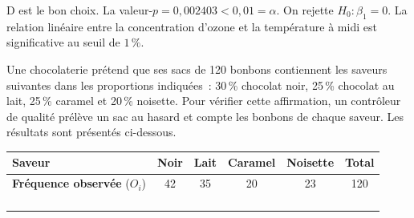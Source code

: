 \begin{questions}
\begin{parts}
\begin{solution}
D est le bon choix. La valeur-$p = 0{,}002403 < 0{,}01 = \alpha$. On rejette $H_0\!: \beta_1=0$. La relation linéaire entre la concentration d'ozone et la température à midi est significative au seuil de $1\,\%$.
\end{solution}

\end{parts}


\pageblanche
\question Une chocolaterie prétend que ses sacs de 120 bonbons contiennent les saveurs suivantes dans les proportions indiquées~: 30\,\% chocolat noir, 25\,\% chocolat au lait, 25\,\% caramel et 20\,\% noisette. Pour vérifier cette affirmation, un contrôleur de qualité prélève un sac au hasard et compte les bonbons de chaque saveur. Les résultats sont présentés ci-dessous.

\begin{center}
\begin{tabular}{l|c|c|c|c|c}
\textbf{Saveur} &\textsc{ } Noir \textsc{ }& \textsc{ } Lait \textsc{ }  & Caramel & Noisette & \textbf{Total}\\
\hline
\textbf{Fréquence observée} ($O_i$) & 42 & 35 & 20 & 23 & 120\\
\hline
&  &  &  &  & \\

&  &  &  &  & \\

\hline
&  &  &  &  & \\

&  &  &  &  & \\
\hline
\end{tabular}
\end{center}

\end{questions}
